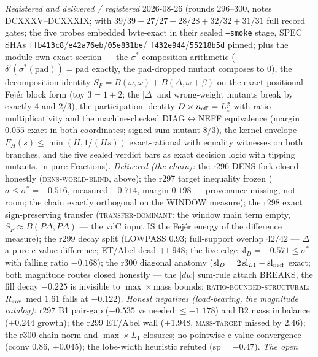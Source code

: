 \documentclass[11pt,a4paper]{article}
\begin{document}
{\sloppy
\emph{Registered and delivered / registered} 2026-08-26 (rounds
296--300, notes DCXXXV--DCXXXIX;
 with $39/39 + 27/27 + 28/28 +
32/32 + 31/31$ full record gates; the five probes embedded
byte-exact in their sealed \texttt{--smoke} stage, SPEC SHAs
\texttt{ffb413c8}/\texttt{e42a76eb}/\texttt{05e831be}/%
\texttt{f432e944}/\texttt{55218b5d} pinned; plus the module-own
exact section --- the $\sigma^*$-composition arithmetic
($\delta'(\sigma^*(\mathrm{pad})) = \mathrm{pad}$ exactly, the
pad-dropped mutant composes to $0$), the decomposition identity
$S_F = B(\omega,\omega) + B(\Delta,\omega+\beta)$ on the exact
positional Fej\'er block form (toy $3 = 1 + 2$; the $|\Delta|$ and
wrong-weight mutants break by exactly $4$ and $2/3$), the
participation identity $D \times n_{\rm eff} = L_1^2$ with ratio
multiplicativity and the machine-checked DIAG$\leftrightarrow$NEFF
equivalence (margin $0.055$ exact in both coordinates; signed-sum
mutant $8/3$), the kernel envelope $F_H(s) \le \min(H, 1/(Hs))$
exact-rational with equality witnesses on both branches, and the
five sealed verdict bars as exact decision logic with tipping
mutants, in pure Fractions).  \emph{Delivered (the chain):} the
r296 DENS fork closed honestly (\textsc{dens-world-blind}, above);
the r297 target inequality frozen ($\sigma \le \sigma^* = -0.516$,
measured $-0.714$, margin $0.198$ --- provenance missing, not
room; the chain exactly orthogonal on the WINDOW measure); the
r298 exact sign-preserving transfer (\textsc{transfer-dominant}:
the window main term empty, $S_F \approx B(P\Delta,P\Delta)$ ---
the vdC input IS the Fej\'er energy of the difference measure);
the r299 decay split (LOWPASS $0.93$; full-support overlap $42/42$
--- $\Delta$ a pure c-value difference; ET/Abel dead $+1.948$; the
live edge $\mathrm{sl}_D = -0.571 \le \sigma^*$ with falling ratio
$-0.168$); the r300 diagonal anatomy ($\mathrm{sl}_D =
2\,\mathrm{sl}_{L1} - \mathrm{sl}_{\rm neff}$ exact; both
magnitude routes closed honestly --- the $|dw|$ sum-rule attach
BREAKS, the fill decay $-0.225$ is invisible to $\max\times$mass
bounds; \textsc{ratio-bounded-structural}: $R_{\rm env}$ med
$1.61$ falls at $-0.122$).  \emph{Honest negatives (load-bearing,
the magnitude catalog):} r297 B1 pair-gap ($-0.535$ vs needed
$\le -1.178$) and B2 mass imbalance ($+0.244$ growth); the r299
ET/Abel wall ($+1.948$, \textsc{mass-target} missed by $2.46$);
the r300 chain-norm and $\max\times L_1$ closures; no pointwise
c-value convergence (cconv $0.86$, $+0.045$); the lobe-width
heuristic refuted ($\mathrm{sp} = -0.47$).  \emph{The open
}}
\end{document}
